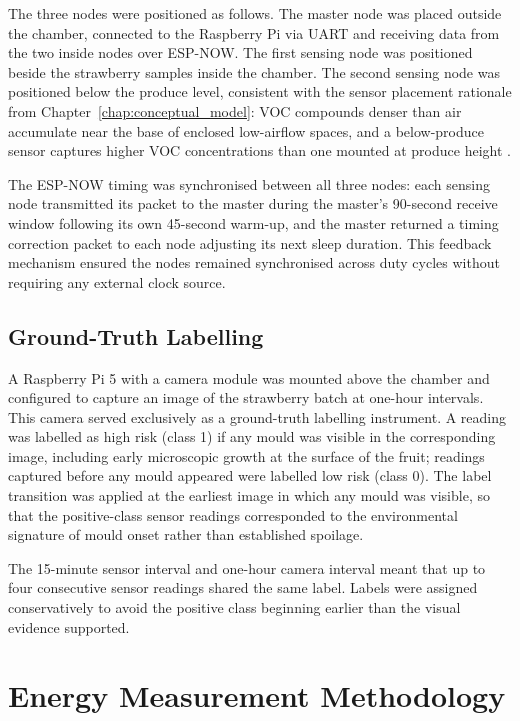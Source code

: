 The three nodes were positioned as follows. The master node was placed outside the chamber, connected to the Raspberry Pi via UART and receiving data from the two inside nodes over ESP-NOW. The first sensing node was positioned beside the strawberry samples inside the chamber. The second sensing node was positioned below the produce level, consistent with the sensor placement rationale from Chapter~\ref{chap:conceptual_model}: VOC compounds denser than air accumulate near the base of enclosed low-airflow spaces, and a below-produce sensor captures higher VOC concentrations than one mounted at produce height \cite{Zhang2026}.

The ESP-NOW timing was synchronised between all three nodes: each sensing node transmitted its packet to the master during the master's 90-second receive window following its own 45-second warm-up, and the master returned a timing correction packet to each node adjusting its next sleep duration. This feedback mechanism ensured the nodes remained synchronised across duty cycles without requiring any external clock source.

\subsection{Ground-Truth Labelling}

A Raspberry Pi 5 with a camera module was mounted above the chamber and configured to capture an image of the strawberry batch at one-hour intervals. This camera served exclusively as a ground-truth labelling instrument. A reading was labelled as high risk (class 1) if any mould was visible in the corresponding image, including early microscopic growth at the surface of the fruit; readings captured before any mould appeared were labelled low risk (class 0). The label transition was applied at the earliest image in which any mould was visible, so that the positive-class sensor readings corresponded to the environmental signature of mould onset rather than established spoilage.

The 15-minute sensor interval and one-hour camera interval meant that up to four consecutive sensor readings shared the same label. Labels were assigned conservatively to avoid the positive class beginning earlier than the visual evidence supported.

\section{Energy Measurement Methodology}

